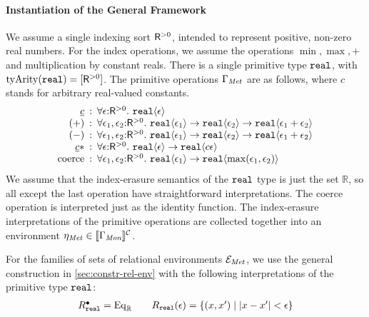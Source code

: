 \paragraph{Instantiation of the General Framework}
We assume a single indexing sort $\mathsf{R}^{>0}$, intended to represent
positive, non-zero real numbers. For the index operations, we assume
the operations $\min, \max, +$ and multiplication by constant
reals. There is a single primitive type $\texttt{real}$, with
$\mathrm{tyArity}(\texttt{real}) = [\mathsf{R}^{>0}]$. The primitive
operations $\Gamma_{\mathit{Met}}$ are as follows, where $c$ stands for
arbitrary real-valued constants.
\begin{displaymath}
  \begin{array}{r@{\hspace{0.5em}:\hspace{0.5em}}l}
    \underline{c} & \forall \epsilon\mathord:\metricSort.\ \tyPrim{real}{\epsilon} \\
    (+) & \forall \epsilon_1, \epsilon_2\mathord:\metricSort.\ \tyPrim{real}{\epsilon_1} \to \tyPrim{real}{\epsilon_2} \to \tyPrim{real}{\epsilon_1 + \epsilon_2} \\
    (-) & \forall \epsilon_1, \epsilon_2\mathord:\metricSort.\ \tyPrim{real}{\epsilon_1} \to \tyPrim{real}{\epsilon_2} \to \tyPrim{real}{\epsilon_1 + \epsilon_2} \\
    \underline{c} * & \forall \epsilon\mathord:\metricSort.\ \tyPrim{real}{\epsilon} \to \tyPrim{real}{c\epsilon} \\
    \mathrm{coerce} & \forall \epsilon_1,\epsilon_2\mathord:\metricSort.\ \tyPrim{real}{\epsilon_1} \to \tyPrim{real}{\max(\epsilon_1,\epsilon_2)}
  \end{array}
\end{displaymath}
We assume that the index-erasure semantics of the $\texttt{real}$
type is just the set $\mathbb{R}$, so all except the last operation
have straightforward interpretations. The $\mathrm{coerce}$ operation
is interpreted just as the identity function. The index-erasure
interpretations of the primitive operations are collected together
into an environment $\eta_{\mathit{Met}} \in \llbracket \Gamma_{\textit{Mon}} \rrbracket^{\mathcal{C}}$.

For the families of sets of relational environments
$\mathcal{E}_{\mathit{Met}}$, we use the general construction in
\autoref{sec:constr-rel-env} with the following interpretations of the
primitive type $\texttt{real}$:
\begin{displaymath} %
  \begin{array}{l@{\hspace{2em}}l}
    R^\bullet_{\tyPrimNm{real}} = \Eq_\mathbb{R} &
    R_{\tyPrimNm{real}}(\epsilon) = \{ (x,x') \sepbar |x - x'| < \epsilon \}
  \end{array}
\end{displaymath}

